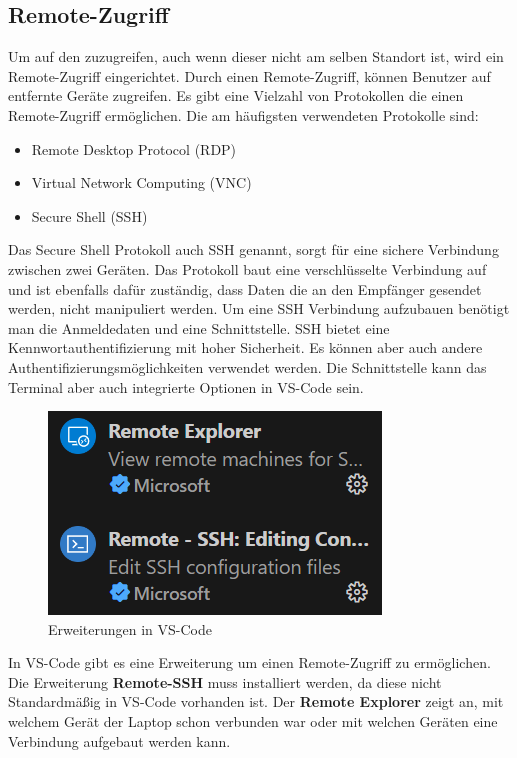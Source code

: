 \subsection{Remote-Zugriff}\label{sec:Remote Zugriff}
Um auf den \raspi zuzugreifen, auch wenn dieser nicht am selben Standort ist, wird ein Remote-Zugriff eingerichtet. Durch einen Remote-Zugriff, können Benutzer auf entfernte Geräte zugreifen. Es gibt eine Vielzahl von Protokollen die einen Remote-Zugriff ermöglichen. Die am häufigsten verwendeten Protokolle sind:
\begin{itemize}
  \item Remote Desktop Protocol (RDP)
  \item Virtual Network Computing (VNC)
  \item Secure Shell (SSH)
\end{itemize}
\vspace{3mm}
Das Secure Shell Protokoll auch SSH genannt, sorgt für eine sichere Verbindung zwischen zwei Geräten. Das Protokoll baut eine verschlüsselte Verbindung auf und ist ebenfalls dafür zuständig, dass Daten die an den Empfänger gesendet werden, nicht manipuliert werden. Um eine SSH Verbindung aufzubauen  benötigt man die Anmeldedaten und eine Schnittstelle. SSH bietet eine  Kennwortauthentifizierung mit hoher Sicherheit. Es können aber auch andere Authentifizierungsmöglichkeiten verwendet werden. Die Schnittstelle kann das Terminal aber auch integrierte Optionen in VS-Code sein.\\
\vspace{3mm}
\begin{figure}
  \includegraphics[scale = 1.2]{image/Erweiterungen.png}
  \caption{Erweiterungen in VS-Code}
\end{figure}
In VS-Code gibt es eine Erweiterung um einen Remote-Zugriff zu ermöglichen. Die Erweiterung \textbf{Remote-SSH} muss installiert werden, da diese nicht Standardmäßig in VS-Code vorhanden ist. Der \textbf{Remote Explorer} zeigt an, mit welchem Gerät der Laptop schon verbunden war oder mit welchen Geräten eine Verbindung aufgebaut werden kann.\\
